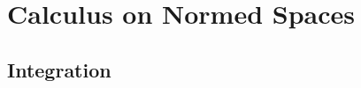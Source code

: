 \documentclass[crop=false,class=article,oneside]{standalone}
\begin{document}
    \ifx\ifworkmasterswork\undefined
        \section*{Calculus on Normed Spaces}
        \setcounter{section}{1}
    \fi
    \subsection{Integration}
\end{document}
